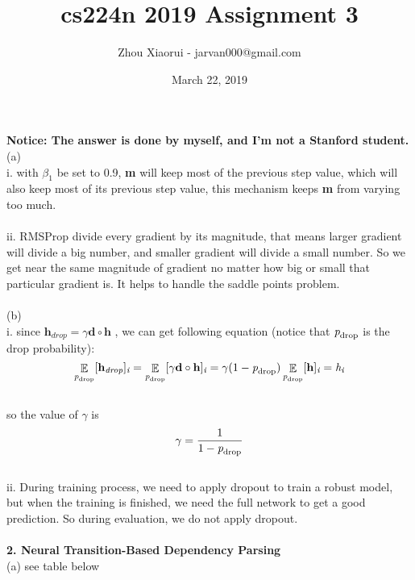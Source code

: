 \documentclass{article}
\title{cs224n 2019 Assignment 3}
\author{Zhou Xiaorui - jarvan000@gmail.com}
\date{March 22, 2019}
\DeclareMathOperator{\E}{\mathbb{E}}
\begin{document}
\maketitle
\textbf{Notice: The answer is done by myself, and I'm not a Stanford student.}
\\
(a)
\\
i. with \(\beta_1\) be set to 0.9, \textbf{m} will keep most of the previous step value, which will also keep most of its previous step value, this mechanism keeps \textbf{m} from varying too much.
\\
\\
ii. RMSProp divide every gradient by its magnitude, that means larger gradient will divide a big number, and smaller gradient will divide a small number. So we get near the same magnitude of gradient no matter how big or small that particular gradient is. It helps to handle the saddle points problem.
\\
\\
(b)
\\
i. since \( \textbf{h}_{\textit{drop}} = \gamma \textbf{d} \circ \textbf{h} \) , we can get following equation (notice that \(\textit{p}_{\rm drop}\) is the drop probability):
\\
\[ \E_{\textit{p}_{\rm drop}} [\textbf{h}_{\textit{drop}}]_{\textit{i}} = \E_{\textit{p}_{\rm drop}} [\gamma \textbf{d} \circ \textbf{h}]_{\textit{i}} = \gamma (1 - \textit{p}_{\rm drop}) \E_{\textit{p}_{\rm drop}} [\textbf{h}]_{\textit{i}} = \textit{h}_{\textit{i}} \]
\\
so the value of \(\gamma\) is
\\
\[ \gamma = \frac {1} {1- \textit{p}_{\rm drop}} \]
\\
ii. During training process, we need to apply dropout to train a robust model, but when the training is finished, we need the full network to get a good prediction. So during evaluation, we do not apply dropout.
\\
\\
\textbf{2. Neural Transition-Based Dependency Parsing}
\\
(a) see table below
\end{document}
